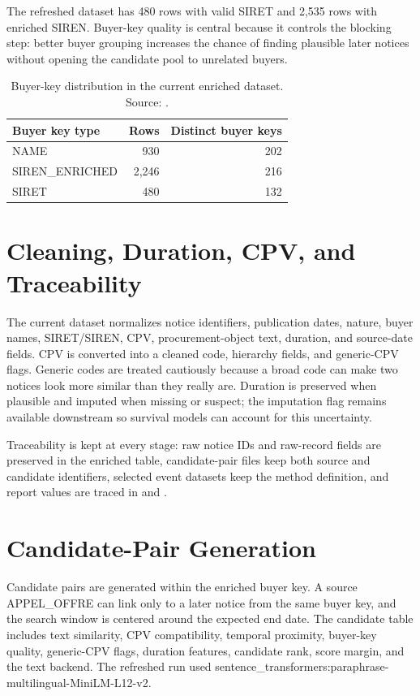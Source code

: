 \documentclass[11pt,a4paper]{article}
\begin{document}
The refreshed dataset has 480 rows with valid SIRET and 2,535 rows with enriched SIREN. Buyer-key quality is central because it controls the blocking step: better buyer grouping increases the chance of finding plausible later notices without opening the candidate pool to unrelated buyers.

\begin{table}[H]
\centering
\caption{Buyer-key distribution in the current enriched dataset. Source: \protect{}.}
\begin{tabular}{lrr}
\toprule
Buyer key type & Rows & Distinct buyer keys \\
\midrule
NAME & 930 & 202 \\
SIREN\_ENRICHED & 2,246 & 216 \\
SIRET & 480 & 132 \\
\bottomrule
\end{tabular}
\end{table}

\section{Cleaning, Duration, CPV, and Traceability}
The current dataset normalizes notice identifiers, publication dates, nature, buyer names, SIRET/SIREN, CPV, procurement-object text, duration, and source-date fields. CPV is converted into a cleaned code, hierarchy fields, and generic-CPV flags. Generic codes are treated cautiously because a broad code can make two notices look more similar than they really are. Duration is preserved when plausible and imputed when missing or suspect; the imputation flag remains available downstream so survival models can account for this uncertainty.

Traceability is kept at every stage: raw notice IDs and raw-record fields are preserved in the enriched table, candidate-pair files keep both source and candidate identifiers, selected event datasets keep the method definition, and report values are traced in \protect{} and \protect{}.

\section{Candidate-Pair Generation}
Candidate pairs are generated within the enriched buyer key. A source APPEL\_OFFRE can link only to a later notice from the same buyer key, and the search window is centered around the expected end date. The candidate table includes text similarity, CPV compatibility, temporal proximity, buyer-key quality, generic-CPV flags, duration features, candidate rank, score margin, and the text backend. The refreshed run used sentence\_transformers:paraphrase-multilingual-MiniLM-L12-v2.
\end{document}
